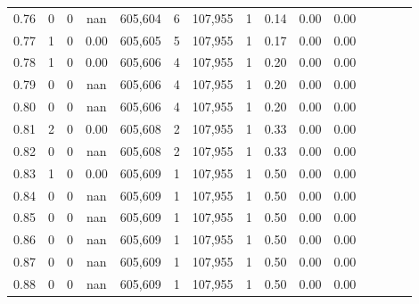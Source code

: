\begin{tabular}{rrrcrrrrrrrrrrr}
0.76 &        0 &       0 &                                        nan &  605,604 &        6 &  107,955 &        1 &  0.14 &  0.00 &                         0.00 \\
0.77 &        1 &       0 &                                       0.00 &  605,605 &        5 &  107,955 &        1 &  0.17 &  0.00 &                         0.00 \\
0.78 &        1 &       0 &                                       0.00 &  605,606 &        4 &  107,955 &        1 &  0.20 &  0.00 &                         0.00 \\
0.79 &        0 &       0 &                                        nan &  605,606 &        4 &  107,955 &        1 &  0.20 &  0.00 &                         0.00 \\
0.80 &        0 &       0 &                                        nan &  605,606 &        4 &  107,955 &        1 &  0.20 &  0.00 &                         0.00 \\
0.81 &        2 &       0 &                                       0.00 &  605,608 &        2 &  107,955 &        1 &  0.33 &  0.00 &                         0.00 \\
0.82 &        0 &       0 &                                        nan &  605,608 &        2 &  107,955 &        1 &  0.33 &  0.00 &                         0.00 \\
0.83 &        1 &       0 &                                       0.00 &  605,609 &        1 &  107,955 &        1 &  0.50 &  0.00 &                         0.00 \\
0.84 &        0 &       0 &                                        nan &  605,609 &        1 &  107,955 &        1 &  0.50 &  0.00 &                         0.00 \\
0.85 &        0 &       0 &                                        nan &  605,609 &        1 &  107,955 &        1 &  0.50 &  0.00 &                         0.00 \\
0.86 &        0 &       0 &                                        nan &  605,609 &        1 &  107,955 &        1 &  0.50 &  0.00 &                         0.00 \\
0.87 &        0 &       0 &                                        nan &  605,609 &        1 &  107,955 &        1 &  0.50 &  0.00 &                         0.00 \\
0.88 &        0 &       0 &                                        nan &  605,609 &        1 &  107,955 &        1 &  0.50 &  0.00 &                         0.00 \\

\end{tabular}

